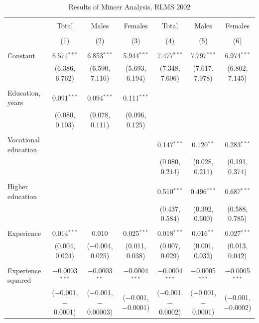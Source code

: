 \documentclass[alpha-refs]{wiley-article-01g}
\begin{document}
\begin{landscape}

\fontsize{9}{11}
\selectfont

\begin{table}[!htbp] \centering 
\renewcommand{\arraystretch}{1.0}
  \caption{Results of Mincer Analysis, RLMS 2002} 
  \label{} 
\begin{tabular}{@{\extracolsep{5pt}}lcccccc} 
\\[-1.8ex]\hline 
\hline \\[-1.8ex] 
 & Total & Males & Females & Total & Males & Females \\ 
\\[-1.8ex] & (1) & (2) & (3) & (4) & (5) & (6)\\ 
\hline \\[-1.8ex] 
 Constant & 6.574$^{***}$ & 6.853$^{***}$ & 5.944$^{***}$ & 7.477$^{***}$ & 7.797$^{***}$ & 6.974$^{***}$ \\ 
  & (6.386, 6.762) & (6.590, 7.116) & (5.693, 6.194) & (7.348, 7.606) & (7.617, 7.978) & (6.802, 7.145) \\ 
  & & & & & & \\ 
 Education, years & 0.091$^{***}$ & 0.094$^{***}$ & 0.111$^{***}$ &  &  &  \\ 
  & (0.080, 0.103) & (0.078, 0.111) & (0.096, 0.125) &  &  &  \\ 
  & & & & & & \\ 
 Vocational education &  &  &  & 0.147$^{***}$ & 0.120$^{**}$ & 0.283$^{***}$ \\ 
  &  &  &  & (0.080, 0.214) & (0.028, 0.211) & (0.191, 0.374) \\ 
  & & & & & & \\ 
 Higher education &  &  &  & 0.510$^{***}$ & 0.496$^{***}$ & 0.687$^{***}$ \\ 
  &  &  &  & (0.437, 0.584) & (0.392, 0.600) & (0.588, 0.785) \\ 
  & & & & & & \\ 
 Experience & 0.014$^{***}$ & 0.010 & 0.025$^{***}$ & 0.018$^{***}$ & 0.016$^{**}$ & 0.027$^{***}$ \\ 
  & (0.004, 0.024) & ($-$0.004, 0.025) & (0.011, 0.038) & (0.007, 0.029) & (0.001, 0.032) & (0.013, 0.042) \\ 
  & & & & & & \\ 
 Experience squared & $-$0.0003$^{***}$ & $-$0.0003$^{**}$ & $-$0.0004$^{***}$ & $-$0.0004$^{***}$ & $-$0.0005$^{***}$ & $-$0.0005$^{***}$ \\ 
  & ($-$0.001, $-$0.0001) & ($-$0.001, $-$0.00003) & ($-$0.001, $-$0.0001) & ($-$0.001, $-$0.0002) & ($-$0.001, $-$0.0001) & ($-$0.001, $-$0.0002) \\ 

\end{tabular}
\end{table}
\end{landscape}
\end{document}
